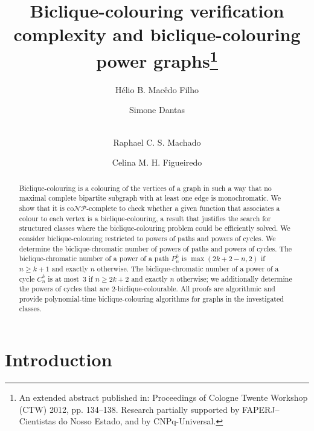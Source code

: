 \documentclass{article}
\begin{document}
\title{Biclique-colouring verification complexity and 
biclique-colouring power graphs\thanks{An extended abstract published in: Proceedings
of Cologne Twente Workshop (CTW) 2012, pp. 134--138.
Research partially supported by FAPERJ--Cientistas do Nosso Estado,
and by CNPq-Universal.}}



\author[1]{H\'elio B. Mac\^edo Filho}
\author[2]{Simone Dantas}
\author[3]{\\ Raphael C. S. Machado}
\author[1]{Celina M. H. Figueiredo}

\date{}

\maketitle

\let\thefootnote\relax\footnotetext{
\hfill\today
}

\begin{abstract}
Biclique-colouring is a colouring of the vertices of a graph in such a way that
no maximal complete bipartite subgraph with at least one edge is monochromatic. 
We show that it is co$\mathcal{NP}$-complete to check whether a given 
function that associates a colour to each vertex is a biclique-colouring, 
a result that justifies the search for structured classes where the 
biclique-colouring problem could be efficiently solved. We consider 
biclique-colouring restricted to powers of paths and powers of cycles.    
We determine the biclique-chromatic number of
powers of paths and powers of cycles. The biclique-chromatic number of a power
of a path $P_{n}^{k}$ is $\max(2k + 2 - n, 2)$ if $n \geq k + 1$ and exactly
$n$ otherwise. The biclique-chromatic number of a power of a cycle $C_n^k$
is at most~3 if $n \geq 2k + 2$ and exactly $n$ otherwise; we additionally determine the powers
of cycles that are 2-biclique-colourable. All proofs are algorithmic and
provide polynomial-time biclique-colouring algorithms for graphs in the
investigated classes.
\end{abstract}


\section{Introduction}
\label{s:introduction}
\end{document}
